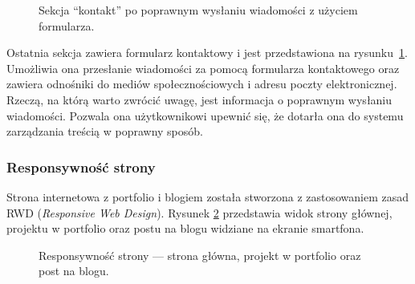 \documentclass[a4paper, 12pt, twoside]{article}
\numberwithin{figure}{section}
\begin{document}
\begin{sloppypar}
\begin{figure}[H] 
    \centering
   \caption{Sekcja ``kontakt'' po poprawnym wysłaniu wiadomości z użyciem formularza.}
   \label{fig:gotowa-aplikacja-10.jpg}
\end{figure}

Ostatnia sekcja zawiera formularz kontaktowy i jest przedstawiona na rysunku~\ref{fig:gotowa-aplikacja-10.jpg}. Umożliwia ona przesłanie wiadomości za pomocą formularza kontaktowego oraz zawiera odnośniki do mediów społecznościowych i adresu poczty elektronicznej. Rzeczą, na którą warto zwrócić uwagę, jest informacja o poprawnym wysłaniu wiadomości. Pozwala ona użytkownikowi upewnić się, że dotarła ona do systemu zarządzania treścią w poprawny sposób. 



\subsubsection*{Responsywność strony}

Strona internetowa z portfolio i blogiem została stworzona z zastosowaniem zasad RWD (\textit{Responsive Web Design}). Rysunek \ref{fig:resposywnosc.jpg} przedstawia widok strony głównej, projektu w portfolio oraz postu na blogu widziane na ekranie smartfona. 

\begin{figure}[H] 
    \centering
   \caption{Responsywność strony --- strona główna, projekt w portfolio oraz post na blogu.}
   \label{fig:resposywnosc.jpg}
\end{figure}


\end{sloppypar}
\end{document}
